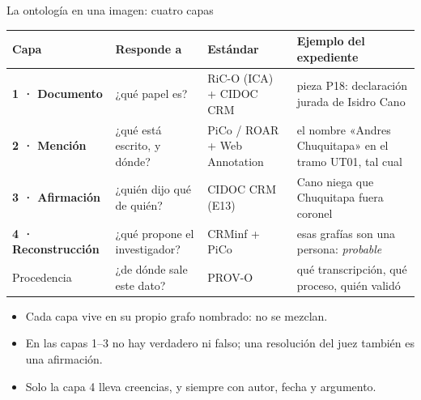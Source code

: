 \documentclass[aspectratio=169,10pt]{beamer}
\begin{document}
\begin{frame}{La ontología en una imagen: cuatro capas}
\footnotesize
\begin{tabular}{@{}L{2.7cm}L{3.0cm}L{3.2cm}L{4.4cm}@{}}
\toprule
Capa & Responde a & Estándar & Ejemplo del expediente \\
\midrule
\textbf{1 · Documento} & ¿qué papel es? & RiC-O (ICA) + CIDOC CRM & pieza P18: declaración jurada de Isidro Cano \\
\textbf{2 · Mención} & ¿qué está escrito, y dónde? & PiCo / ROAR + Web Annotation & el nombre «Andres Chuquitapa» en el tramo UT01, tal cual \\
\textbf{3 · Afirmación} & ¿quién dijo qué de quién? & CIDOC CRM (E13) & Cano \alert{niega} que Chuquitapa fuera coronel \\
\textbf{4 · Reconstruc\-ción} & ¿qué propone el investigador? & CRMinf + PiCo & esas grafías son una persona: \emph{probable} \\
\midrule
Procedencia & ¿de dónde sale este dato? & PROV-O & qué transcripción, qué proceso, quién validó \\
\bottomrule
\end{tabular}

\bigskip
\small
\begin{itemize}
\item Cada capa vive en su propio grafo nombrado: no se mezclan.
\item En las capas 1--3 \alert{no hay verdadero ni falso}; una resolución del juez también es una afirmación.
\item Solo la capa 4 lleva creencias, y siempre con autor, fecha y argumento.
\end{itemize}
\end{frame}
\end{document}
